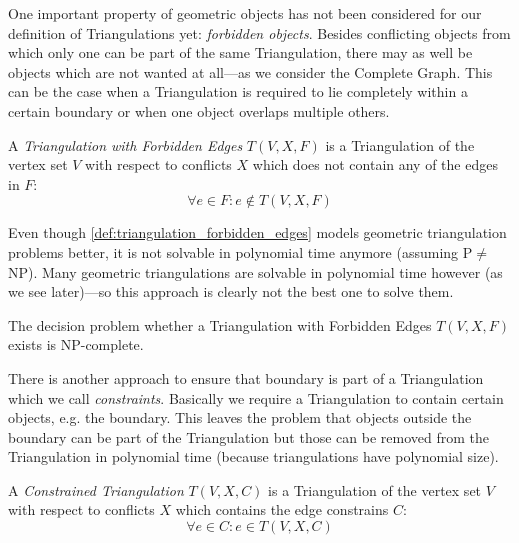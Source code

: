 One important property of geometric objects has not been considered
for our definition of Triangulations yet: \emph{forbidden objects}.
Besides conflicting objects
from which only one can be part of the same Triangulation, there may
as well be objects which are not wanted at all---as we consider the
Complete Graph. This can be the case when a Triangulation is required
to lie completely within a certain boundary or when one object
overlaps multiple others.

\begin{definition}
  \label{def:triangulation_forbidden_edges}
  A \emph{Triangulation with Forbidden Edges} \(T(V,X,F)\) is a 
  Triangulation of the vertex set \(V\) with respect to conflicts
  \(X\) which does not contain any of the edges in \(F\):
  \[ \forall e \in F : e \not\in T(V,X,F) \]
\end{definition}

Even though \cref{def:triangulation_forbidden_edges} models
geometric triangulation problems better, it is not solvable in
polynomial time anymore (assuming P\(\not=\)NP). Many geometric
triangulations are solvable in polynomial time however (as we see
later)---so this approach is clearly not the best one to solve them.

\begin{theorem}
  The decision problem whether 
  a Triangulation with Forbidden Edges \(T(V,X,F)\) exists
  is NP-complete.
  \cite[triangulation existence problem]{triangulation_forbidden_edges}
\end{theorem}

There is another approach to ensure that boundary is part of a
Triangulation which we call \emph{constraints}. Basically we require
a Triangulation to contain certain objects, e.g. the boundary. This
leaves the problem that objects outside the boundary can be part of
the Triangulation but those can be removed from the Triangulation
in polynomial time (because triangulations have polynomial size).

\begin{definition}
  \label{def:constrained_triangulation}
  A \emph{Constrained Triangulation} \(T(V,X,C)\) is a Triangulation
  of the vertex set \(V\) with respect to conflicts \(X\) which 
  contains the edge constrains \(C\):
  \[ \forall e \in C : e \in T(V,X,C) \]
\end{definition}

